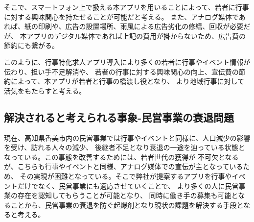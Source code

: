 \documentclass[a4paper,dvipdfmx]{jarticle}
\begin{document}
そこで、スマートフォン上で扱える本アプリを用いることによって、若者に行事に対する興味関心を持たせることが可能だと考える。
また、アナログ媒体であれば、紙の印刷や、広告の設置場所、雨風による広告劣化の修繕、回収が必要だが、
本アプリのデジタル媒体であれば上記の費用が掛からないため、広告費の節約にも繋がる。
\par
このように、行事特化求人アプリ導入により多くの若者に行事やイベント情報が伝わり、担い手不足解消や、
若者の行事に対する興味関心の向上、宣伝費の節約によって、本アプリが若者と行事の橋渡し役となり、
より地域行事に対して活気をもたらすと考える。
\subsection{解決されると考えられる事象-民営事業の衰退問題}
現在、高知県香美市内の民営事業では行事やイベントと同様に、人口減少の影響を受け、訪れる人々の減少、
後継者不足となり衰退の一途を辿っている状態となっている。この事態を改善するためには、若者世代の獲得が
不可欠となるが、こちらも行事やイベントと同様、アナログ媒体での宣伝が主となっているため、
その実現が困難となっている。そこで弊社が提案するアプリを行事やイベントだけでなく、民営事業にも適応させていくことで、
より多くの人に民営事業の存在を認知してもらうことが可能となり、
同時に働き手の募集も可能となることから、民営事業の衰退を防ぐ起爆剤となり現状の課題を解決する手段となると考える。
\end{document}

